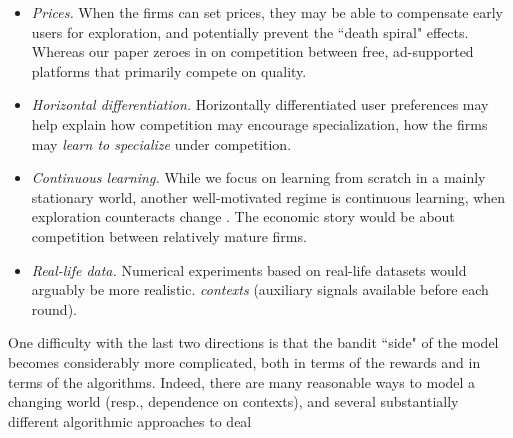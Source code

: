 \documentclass[../competing_bandits.tex]{subfiles}
\begin{document}
\begin{itemize}

\item \emph{Prices.}
When the firms can set prices, they may be able to compensate early users for exploration, and potentially prevent the ``death spiral" effects. Whereas our paper zeroes in on competition between free, ad-supported platforms that primarily compete on quality.

\item \emph{Horizontal differentiation.}
Horizontally differentiated user preferences may help explain how competition may encourage specialization, \ie how the firms may \emph{learn to specialize} under competition.


\item \emph{Continuous learning.}
While we focus on learning from scratch in a mainly stationary world, another well-motivated regime is continuous learning, when exploration counteracts change
\citep{DynamicMAB-colt08}.
The economic story would be about competition between relatively mature firms.

\item \emph{Real-life data.}
Numerical experiments based on real-life datasets would arguably be more realistic.  \emph{contexts} (auxiliary signals available before each round).

\end{itemize}

\noindent One difficulty with the last two directions is that the bandit ``side" of the model becomes considerably more complicated, both in terms of the rewards and in terms of the algorithms. Indeed, there are many reasonable ways to model a changing world (resp., dependence on  contexts), and several  substantially different algorithmic approaches to deal 
\end{document}
